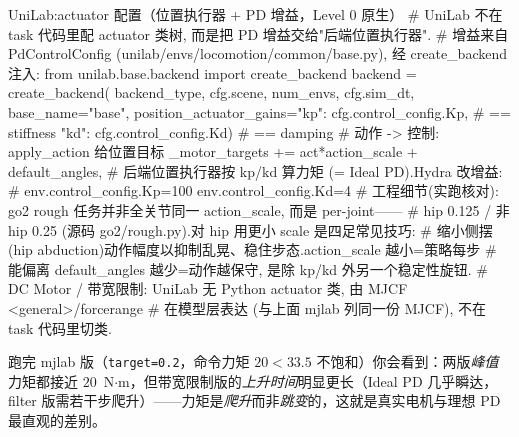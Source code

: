 \begin{codebox}[Python]{UniLab:actuator 配置（位置执行器 + PD 增益，Level 0 原生）}
# UniLab 不在 task 代码里配 actuator 类树, 而是把 PD 增益交给"后端位置执行器".
# 增益来自 PdControlConfig (unilab/envs/locomotion/common/base.py), 经 create_backend 注入:
from unilab.base.backend import create_backend
backend = create_backend(
    backend_type, cfg.scene, num_envs, cfg.sim_dt,
    base_name="base",
    position_actuator_gains={"kp": cfg.control_config.Kp,    # == stiffness
                             "kd": cfg.control_config.Kd})   # == damping
# 动作 -> 控制: apply_action 给位置目标 _motor_targets += act*action_scale + default_angles,
# 后端位置执行器按 kp/kd 算力矩 (= Ideal PD).Hydra 改增益:
#   env.control_config.Kp=100 env.control_config.Kd=4
# 工程细节(实跑核对): go2 rough 任务并非全关节同一 action_scale, 而是 per-joint——
#   hip 0.125 / 非 hip 0.25 (源码 go2/rough.py).对 hip 用更小 scale 是四足常见技巧:
#   缩小侧摆(hip abduction)动作幅度以抑制乱晃、稳住步态.action_scale 越小=策略每步
#   能偏离 default_angles 越少=动作越保守, 是除 kp/kd 外另一个稳定性旋钮.
# DC Motor / 带宽限制: UniLab 无 Python actuator 类, 由 MJCF <general>/forcerange
#   在模型层表达 (与上面 mjlab 列同一份 MJCF), 不在 task 代码里切类.
\end{codebox}

\noindent{}跑完 mjlab 版（\verb|target=0.2|，命令力矩 $20<33.5$ 不饱和）你会看到：两版\emph{峰值}力矩都接近 $20$~N$\cdot$m，但带宽限制版的\emph{上升时间}明显更长（Ideal PD 几乎瞬达，filter 版需若干步爬升）——力矩是\emph{爬升}而非\emph{跳变}的，这就是真实电机与理想 PD 最直观的差别。


